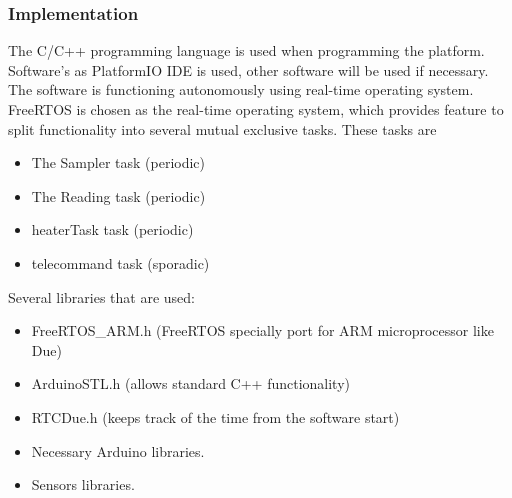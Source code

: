 \subsubsection{Implementation}\label{sec:4.8.3}
The C/C++ programming language is used when programming the platform. Software's as PlatformIO IDE is used, other software will be used if necessary. The software is functioning autonomously using real-time operating system. FreeRTOS is chosen as the real-time operating system, which provides feature to split functionality into several mutual exclusive tasks. These tasks are \begin{itemize}
    \item The Sampler task (periodic)
    \item The Reading task (periodic)
    \item heaterTask task (periodic)
    \item telecommand task (sporadic)
\end{itemize} 
Several libraries that are used:
\begin{itemize}
    \item FreeRTOS\_ARM.h (FreeRTOS specially port for ARM microprocessor like Due)
    \item ArduinoSTL.h (allows standard C++ functionality)
    \item RTCDue.h (keeps track of the time from the software start)
    \item Necessary Arduino libraries.
    \item Sensors libraries.
\end{itemize}


\raggedbottom